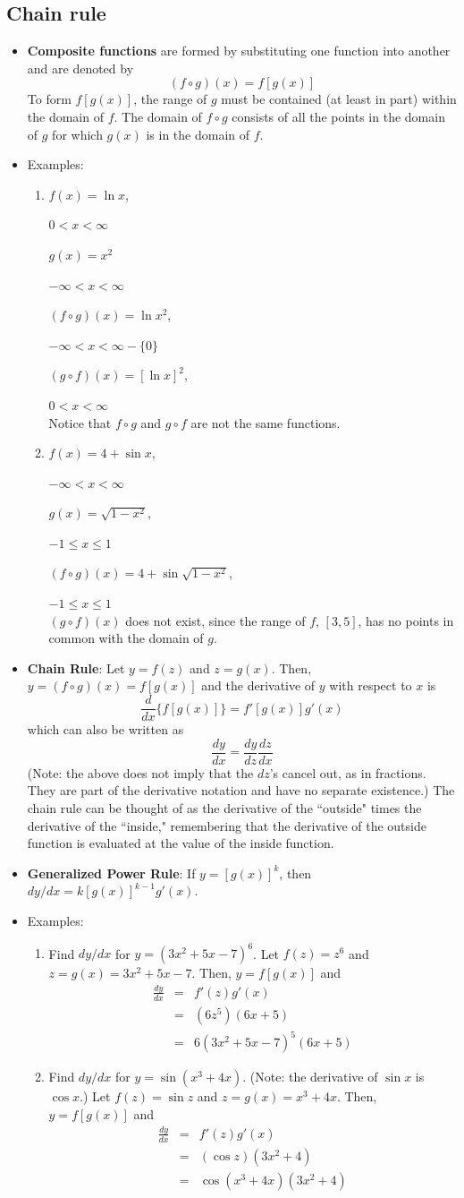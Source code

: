 \documentclass[20pt]{extarticle}
\newcommand{\bi}{\begin{itemize}}
\newcommand{\ei}{\end{itemize}}
\newcommand{\be}{\begin{enumerate}}
\newcommand{\ee}{\end{enumerate}}
\newcommand{\pbt}{\parbox[t]{2in}}
\newcommand{\beqa}{\begin{eqnarray}}
\newcommand{\eeqa}{\end{eqnarray}}
\newcommand{\non}{\nonumber}
\begin{document}
\subsection{Chain rule}
\bi
\item {\bf Composite functions} are formed by substituting one function
into another and are denoted by $$(f\circ g)(x)=f[g(x)]$$  To form
 $f[g(x)]$, the range of $g$ must be contained (at least in part) within
the domain of $f$. The domain of $f\circ g$ consists of all the points
in the domain of $g$ for which $g(x)$ is in the domain of $f$.
\item Examples:
  \be
  \item \pbt{$f(x)=\ln x$,}  $0<x<\infty$\\
  \pbt{$g(x)=x^2$} $-\infty<x<\infty$\\
  \pbt{$(f\circ g)(x)=\ln x^2$,} $-\infty<x<\infty - \{0\}$\\
  \pbt{$(g\circ f)(x)=[\ln x]^2$,} $0<x<\infty$\\
  Notice that $f\circ g$ and $g\circ f$ are not the same functions.
  \item \pbt{$f(x)=4+\sin x$,} $-\infty<x<\infty$\\
  \pbt{$g(x)=\sqrt{1-x^2}$,} $-1\le x\le 1$\\
  \pbt{$(f\circ g)(x)=4+\sin \sqrt{1-x^2}$,} $-1\le x\le 1$\\
  $(g\circ f)(x)$ does not exist, since the range of $f$, $[3,5]$, has no
points in common with the domain of $g$.
  \ee

\item {\bf Chain Rule}:  Let $y=f(z)$ and $z=g(x)$.  Then, $y=(f\circ
g)(x)=f[g(x)]$ and the derivative of $y$ with respect to $x$ is
$$\frac{d}{dx} \{ f[g(x)] \} = f'[g(x)] g'(x)$$ which can also be
written as $$\frac{dy}{dx}=\frac{dy}{dz} \frac{dz}{dx}$$ (Note: the
above does not imply that the $dz$'s cancel out, as in fractions.  They
are part of the derivative notation and have no separate existence.)
The chain rule can be thought of as the derivative of the ``outside"
times the derivative of the ``inside," remembering that the derivative
of the outside function is evaluated at the value of the inside
function.

\item {\bf Generalized Power Rule}:  If $y=[g(x)]^k$, then
$dy/dx=k[g(x)]^{k-1}g'(x)$.

\item Examples:
  \be
  \item Find $dy/dx$ for $y=(3x^2+5x-7)^6$.
Let $f(z)=z^6$ and $z=g(x)=3x^2+5x-7$.  Then, $y=f[g(x)]$ and
\beqa
\frac{dy}{dx}&=& f'(z) g'(x)\non\\
             &=& \left(6z^5\right) (6x+5)\non\\
             &=& 6\left(3x^2+5x-7\right)^5 (6x+5)\non
\eeqa
  \item Find $dy/dx$ for $y=\sin(x^3+4x)$.
(Note: the derivative of $\sin x$ is $\cos x$.)  Let $f(z)=\sin z$ and
$z=g(x)=x^3+4x$.  Then, $y=f[g(x)]$ and
\beqa
\frac{dy}{dx}&=& f'(z) g'(x)\non\\
             &=& \left(\cos z\right) (3x^2+4)\non\\
             &=& \cos\left(x^3+4x\right) \left(3x^2+4\right)\non
\eeqa
  \ee
\ei
\end{document}

